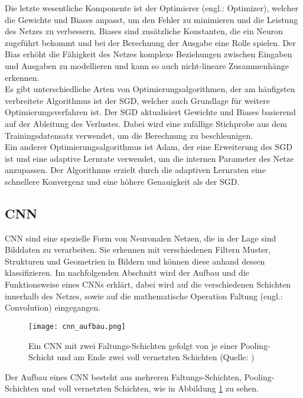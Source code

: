 Die letzte wesentliche Komponente ist der Optimierer (engl.: Optimizer), welcher die Gewichte und Biases anpasst, um den Fehler zu minimieren und die Leistung des Netzes zu verbessern. Biases sind zusätzliche Konstanten, die ein Neuron zugeführt bekommt und bei der Berechnung der Ausgabe eine Rolle spielen. Der Bias erhöht die Fähigkeit des Netzes komplexe Beziehungen zwischen Eingaben und Ausgaben zu modellieren und kann so auch nicht-lineare Zusammenhänge erkennen. \\
Es gibt unterschiedliche Arten von Optimierungsalgorithmen, der am häufigsten verbreitete Algorithmus ist der \ac{SGD}, welcher auch Grundlage für weitere Optimierungsverfahren ist. Der \ac{SGD} aktualisiert Gewichte und Biases basierend auf der Ableitung des Verlustes. Dabei wird eine zufällige Stichprobe aus dem Trainingsdatensatz verwendet, um die Berechnung zu beschleunigen. \cite[vgl.][]{Goodfellow2016} \\
Ein anderer Optimierungsalgorithmus ist Adam, der eine Erweiterung des \ac{SGD} ist und eine adaptive Lernrate verwendet, um die internen Parameter des Netze anzupassen. Der Algorithmus erzielt durch die adaptiven Lernraten eine schnellere Konvergenz und eine höhere Genauigkeit als der \ac{SGD}. \cite[vgl.][]{Kingma2014}

\subsection{\acf{CNN}}
\acf{CNN} sind eine spezielle Form von Neuronalen Netzen, die in der Lage sind Bilddaten zu verarbeiten. Sie erkennen mit verschiedenen Filtern Muster, Strukturen und Geometrien in Bildern und können diese anhand dessen klassifizieren. Im nachfolgenden Abschnitt wird der Aufbau und die Funktionsweise eines \ac{CNN}s erklärt, dabei wird auf die verschiedenen Schichten innerhalb des Netzes, sowie auf die mathematische Operation Faltung (engl.: Convolution) eingegangen.

\begin{figure}[ht]
	\centering
	\texttt{[image: cnn\_aufbau.png]}
	\caption{Ein \ac{CNN} mit zwei Faltungs-Schichten gefolgt von je einer Pooling-Schicht und am Ende
		zwei voll vernetzten Schichten (Quelle: \cite{Ertel2021})}	
	\label{fig:cnn_aufbau}
\end{figure}

Der Aufbau eines \ac{CNN} besteht aus mehreren Faltungs-Schichten, Pooling-Schichten und voll vernetzten Schichten, wie in Abbildung \ref{fig:cnn_aufbau} zu sehen. 

